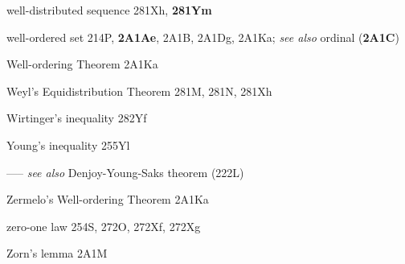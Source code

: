 well-distributed sequence 281Xh, {\bf 281Ym}








well-ordered set 214P, {\bf 2A1Ae}, 2A1B, 2A1Dg, 2A1Ka; 
  {\it see also} ordinal ({\bf 2A1C})


Well-ordering Theorem 2A1Ka








Weyl's Equidistribution Theorem 281M, 281N, 281Xh












Wirtinger's inequality 282Yf












\indexmedskip



Young's inequality 255Yl


----- {\it see also} Denjoy-Young-Saks theorem (222L)



\indexmedskip

Zermelo's Well-ordering Theorem 2A1Ka






zero-one law 254S, 272O, 272Xf, 272Xg








Zorn's lemma 2A1M



\indexmedskip 
















